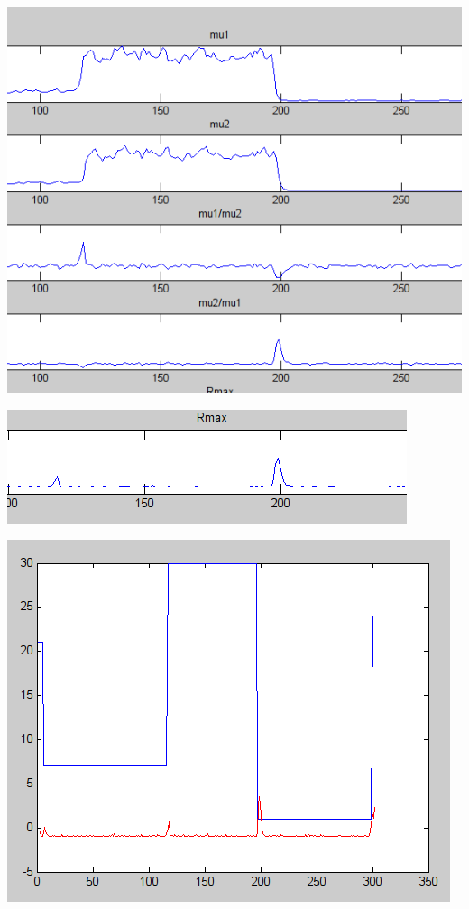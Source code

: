 \documentclass{beamer}
\begin{document}
\begin{frame}
\begin{center}
\includegraphics[scale=0.4]{capture/I.png}
\end{center}
\end{frame}

\begin{frame}
\begin{center}
\includegraphics[scale=0.4]{capture/J.png}
\end{center}
\end{frame}

\begin{frame}
\begin{center}
\includegraphics[scale=0.4]{capture/K.png}
\end{center}
\end{frame}
\end{document}
